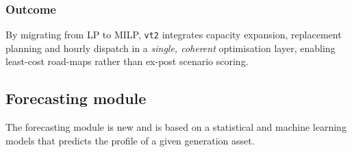 \subsubsection{Outcome}
By migrating from LP to MILP, \texttt{vt2} integrates capacity expansion, replacement planning and hourly dispatch
in a \emph{single, coherent} optimisation layer, enabling least-cost road-maps rather than ex-post scenario scoring.


\subsection{Forecasting module}
\label{sec:forecasting-module}

The forecasting module is new and is based on a statistical and machine learning models 
that predicts the profile of a given generation asset.






\newpage
